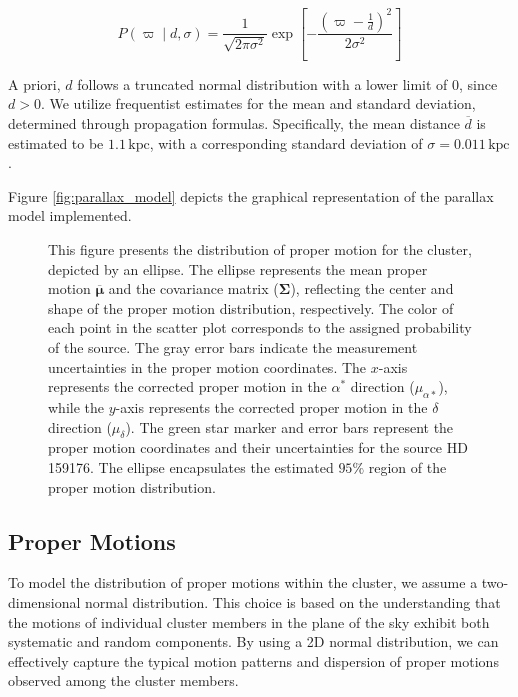 \documentclass[fleqn,usenatbib,usedcolumn,useAMS]{mnras}
\begin{document}
\begin{equation}
P(\varpi \mid d,\sigma) = \frac{1}{\sqrt{2\pi \sigma^2}} \exp{\left[ - \frac{\left(\varpi - \frac{1}{d}\right)^2}{2\sigma^2}\right]}
\end{equation}

A priori, $d$ follows a truncated normal distribution with a lower limit of $0$, since $d > 0$. We utilize frequentist estimates for the mean and standard deviation, determined through propagation formulas. Specifically, the mean distance $\overline{d}$ is estimated to be $1.1\,\textrm{kpc}$, with a corresponding standard deviation of $\sigma = 0.011\,\textrm{kpc}$.

Figure \ref{fig:parallax_model} depicts the graphical representation of the parallax model implemented.

\begin{figure}
	\centering
    \caption{This figure presents the distribution of proper motion for the cluster, depicted by an ellipse. The ellipse represents the mean proper motion $\boldsymbol{\overline{\mu}}$ and the covariance matrix ($\boldsymbol{\Sigma}$), reflecting the center and shape of the proper motion distribution, respectively. The color of each point in the scatter plot corresponds to the assigned probability of the source. The gray error bars indicate the measurement uncertainties in the proper motion coordinates. The $x$-axis represents the corrected proper motion in the $\alpha^*$ direction ($\mu_{\alpha*}$), while the $y$-axis represents the corrected proper motion in the $\delta$ direction ($\mu_\delta$). The green star marker and error bars represent the proper motion coordinates and their uncertainties for the source HD 159176. The ellipse encapsulates the estimated $95\%$ region of the proper motion distribution.}
    \label{fig:pm}
\end{figure}

\subsection{Proper Motions}

To model the distribution of proper motions within the cluster, we assume a two-dimensional normal distribution. This choice is based on the understanding that the motions of individual cluster members in the plane of the sky exhibit both systematic and random components. By using a 2D normal distribution, we can effectively capture the typical motion patterns and dispersion of proper motions observed among the cluster members.
\end{document}
